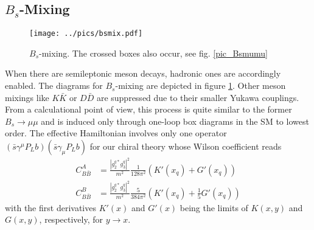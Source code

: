 \subsection{$B_s$-Mixing}
\begin{figure}[t]
 \texttt{[image: ../pics/bsmix.pdf]}
 \caption{$B_s$-mixing. The crossed boxes also occur, see fig. \ref{pic_Bsmumu}}
 \label{pic_Bsmix}
\end{figure}
When there are semileptonic meson decays, hadronic ones are accordingly enabled. The diagrams for $B_s$-mixing are depicted in figure \ref{pic_Bsmix}. Other
meson mixings like $K\bar K$ or $ D \bar D$ are suppressed due to their smaller Yukawa couplings. From a calculational point of view, this process is 
quite similar to the former $B_s\rightarrow \mu\mu$ and is induced only through one-loop box diagrams in the SM to lowest order. The effective Hamiltonian
involves only one operator $(\bar s \gamma^\mu P_L b)(\bar s \gamma_\mu P_L b)$ for our chiral theory whose Wilson coefficient reads
\begin{align}
 C_{B\bar B}^A &=  \frac{|g_2^{q*}g_3^q|^2}{m^2} \frac{1}{128\pi^2} \left(K'(x_q) + G'(x_q)\right)\\
 C_{B\bar B}^B &=  \frac{|g_2^{q*}g_3^q|^2}{m^2} \frac{5}{384\pi^2} \left(K'(x_q) + \frac15 G'(x_q)\right)
\end{align}
with the first derivatives $K'(x)$ and $G'(x)$ being the limits of $K(x,y)$ and $G(x,y)$, respectively, for $y\rightarrow x$. 

